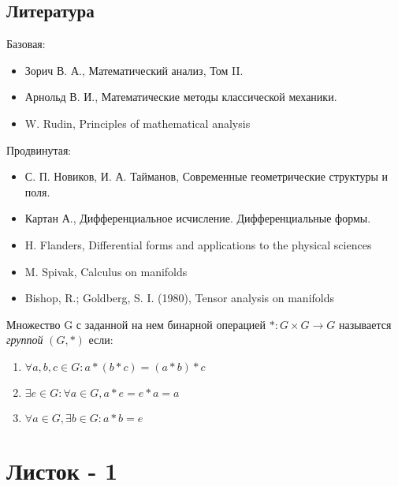 \documentclass{article}
\begin{document}
 	
 	\subsection*{Литература}
 	Базовая:
 	\begin{itemize}
 		\item Зорич В. А., Математический анализ, Том II.
 		\item Арнольд В. И., Математические методы классической механики. 
 		\item  W. Rudin, Principles of mathematical analysis
 	\end{itemize}
 	Продвинутая:
 	\begin{itemize}
 		\item С. П. Новиков, И. А. Тайманов, Современные геометрические структуры и поля.
 		\item Картан А., Дифференциальное исчисление. Дифференциальные формы.
 		\item H. Flanders, Differential forms and applications to the physical sciences
 		\item M. Spivak, Calculus on manifolds
 		\item Bishop, R.; Goldberg, S. I. (1980), Tensor analysis on manifolds
 	\end{itemize}
 	\newpage
 	Множество G с заданной на нем бинарной операцией $*: G \times G \to G$ называется \textit{группой} $(G, *)$ если:
 	\begin{enumerate}
 		\item $\forall a,b,c \in G: a*(b*c) = (a*b)*c $
 		\item $\exists e \in G: \forall a \in G, a*e=e*a=a$
 		\item $\forall a \in G, \exists b\in G: a*b = e$
 	\end{enumerate}
 	{\centering
 		\section*{Листок - 1}}
\end{document}
